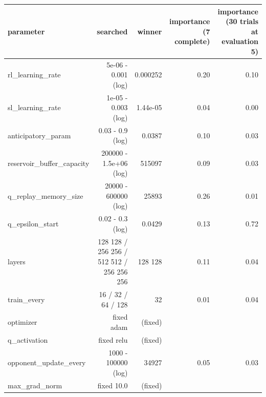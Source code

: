 \begin{tabular}{lrrrr}
\toprule
parameter & searched & winner & importance (7 complete) & importance (30 trials at evaluation 5) \\
\midrule
rl\_learning\_rate & 5e-06 - 0.001 (log) & 0.000252 & 0.20 & 0.10 \\
sl\_learning\_rate & 1e-05 - 0.003 (log) & 1.44e-05 & 0.04 & 0.00 \\
anticipatory\_param & 0.03 - 0.9 (log) & 0.0387 & 0.10 & 0.03 \\
reservoir\_buffer\_capacity & 200000 - 1.5e+06 (log) & 515097 & 0.09 & 0.03 \\
q\_replay\_memory\_size & 20000 - 600000 (log) & 25893 & 0.26 & 0.01 \\
q\_epsilon\_start & 0.02 - 0.3 (log) & 0.0429 & 0.13 & 0.72 \\
layers & 128 128 / 256 256 / 512 512 / 256 256 256 & 128 128 & 0.11 & 0.04 \\
train\_every & 16 / 32 / 64 / 128 & 32 & 0.01 & 0.04 \\
optimizer & fixed adam & (fixed) &  &  \\
q\_activation & fixed relu & (fixed) &  &  \\
opponent\_update\_every & 1000 - 100000 (log) & 34927 & 0.05 & 0.03 \\
max\_grad\_norm & fixed 10.0 & (fixed) &  &  \\
\bottomrule
\end{tabular}
